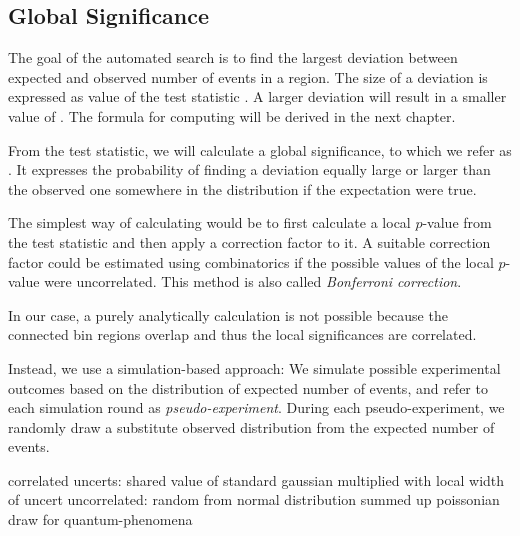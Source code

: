 \subsection{Global Significance}
\label{sec:global_significance}

The goal of the automated search is to find the largest deviation between expected and observed number of events in a region. The size of a deviation is expressed as value of the test statistic \TS. A larger deviation will result in a smaller value of \TS.
The formula for computing \TS will be derived in the next chapter. 

From the test statistic, we will calculate a global significance, to which we refer as \ptilde. It expresses the probability of finding a deviation equally large or larger than the observed one somewhere in the distribution if the expectation were true.

The simplest way of calculating \ptilde would be to first calculate a local $p$-value from the test statistic and then apply a correction factor to it. A suitable correction factor could be estimated using combinatorics if the possible values of the local $p$-value were uncorrelated. This method is also called \emph{Bonferroni correction}. 

In our case, a purely analytically calculation is not possible because the connected bin regions overlap and thus the local significances are correlated.

Instead, we use a simulation-based approach:
We simulate possible experimental outcomes based on the distribution of expected number of events, and refer to each simulation round as \emph{pseudo-experiment}.
During each pseudo-experiment, we randomly draw a substitute observed distribution from the expected number of events. 



correlated uncerts: shared value of standard gaussian multiplied with local width of uncert
uncorrelated: random from normal distribution
summed up
poissonian draw for quantum-phenomena


